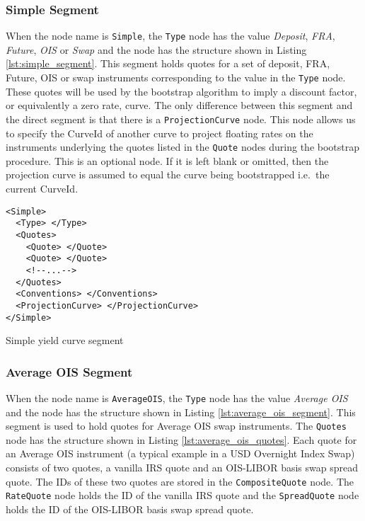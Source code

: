 \subsubsection*{Simple Segment}
When the node name is \lstinline!Simple!, the \lstinline!Type! node has the value \emph{Deposit}, \emph{FRA},
\emph{Future}, \emph{OIS} or \emph{Swap} and the node has the structure shown in Listing \ref{lst:simple_segment}. This
segment holds quotes for a set of deposit, FRA, Future, OIS or swap instruments corresponding to the value in the
\lstinline!Type! node. These quotes will be used by the bootstrap algorithm to imply a discount factor, or equivalently
a zero rate, curve. The only difference between this segment and the direct segment is that there is a
\lstinline!ProjectionCurve! node. This node allows us to specify the CurveId of another curve to project floating rates
on the instruments underlying the quotes listed in the \lstinline!Quote! nodes during the bootstrap procedure. This is
an optional node. If it is left blank or omitted, then the projection curve is assumed to equal the curve being
bootstrapped i.e.\ the current CurveId.

\begin{listing}[H]
\begin{verbatim}
<Simple>
  <Type> </Type>
  <Quotes>
    <Quote> </Quote>
    <Quote> </Quote>
    <!--...-->
  </Quotes>
  <Conventions> </Conventions>
  <ProjectionCurve> </ProjectionCurve>
</Simple>
\end{verbatim}
\caption{Simple yield curve segment}
\label{lst:simple_segment}
\end{listing}

\subsubsection*{Average OIS Segment}
When the node name is \lstinline!AverageOIS!, the \lstinline!Type! node has the value \emph{Average OIS} and the node
has the structure shown in Listing \ref{lst:average_ois_segment}. This segment is used to hold quotes for Average OIS
swap instruments. The \lstinline!Quotes! node has the structure shown in Listing \ref{lst:average_ois_quotes}. Each
quote for an Average OIS instrument (a typical example in a USD Overnight Index Swap) consists of two quotes, a vanilla
IRS quote and an OIS-LIBOR basis swap spread quote.  The IDs of these two quotes are stored in the
\lstinline!CompositeQuote! node. The \lstinline!RateQuote! node holds the ID of the vanilla IRS quote and the
\lstinline!SpreadQuote! node holds the ID of the OIS-LIBOR basis swap spread quote.

